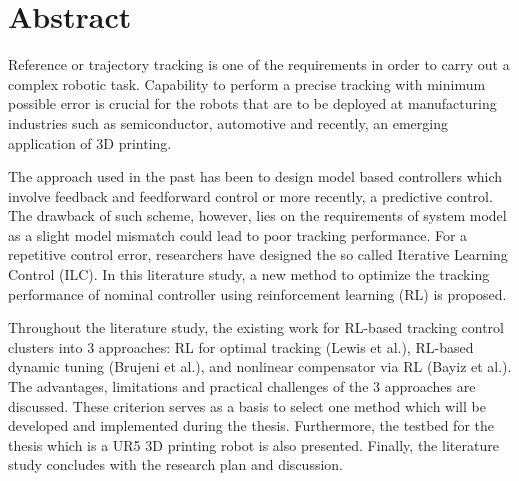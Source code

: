 %
\chapter*{Abstract}%

Reference or trajectory tracking is one of the requirements in order to carry out a complex robotic task. Capability to perform a precise tracking with minimum possible error is crucial for the robots that are to be deployed at manufacturing industries such as semiconductor, automotive and recently, an emerging application of 3D printing.

The approach used in the past has been to design model based controllers which involve feedback and feedforward control or more recently, a predictive control. The drawback of such scheme, however, lies on the requirements of system model as a slight model mismatch could lead to poor tracking performance. For a repetitive control error, researchers have designed the so called Iterative Learning Control (ILC). In this literature study, a new method to optimize the tracking performance of nominal controller using reinforcement learning (RL) is proposed. 

Throughout the literature study, the existing work for RL-based tracking control clusters into 3 approaches: RL for optimal tracking (Lewis et al.), RL-based dynamic tuning (Brujeni et al.), and nonlinear compensator via RL (Bayiz et al.). The advantages, limitations and practical challenges of the 3 approaches are discussed. These criterion serves as a basis to select one method which will be developed and implemented during the thesis. Furthermore, the testbed for the thesis which is a UR5 3D printing robot is also presented. Finally, the literature study concludes with the research plan and discussion.